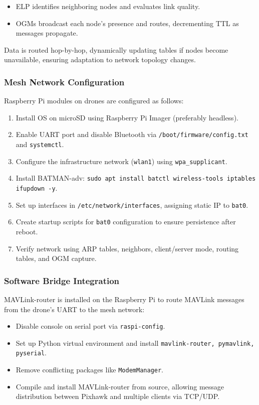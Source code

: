 \begin{itemize}
    \item ELP identifies neighboring nodes and evaluates link quality.
    \item OGMs broadcast each node’s presence and routes, decrementing TTL as messages propagate.
\end{itemize}

Data is routed hop-by-hop, dynamically updating tables if nodes become unavailable, ensuring adaptation to network topology changes.

\subsubsection{Mesh Network Configuration}

Raspberry Pi modules on drones are configured as follows:
\begin{enumerate}
    \item Install OS on microSD using Raspberry Pi Imager (preferably headless).
    \item Enable UART port and disable Bluetooth via \texttt{/boot/firmware/config.txt} and \texttt{systemctl}.
    \item Configure the infrastructure network (\texttt{wlan1}) using \texttt{wpa\_supplicant}.
    \item Install BATMAN-adv: \texttt{sudo apt install batctl wireless-tools iptables ifupdown -y}.
    \item Set up interfaces in \texttt{/etc/network/interfaces}, assigning static IP to \texttt{bat0}.
    \item Create startup scripts for \texttt{bat0} configuration to ensure persistence after reboot.
    \item Verify network using ARP tables, neighbors, client/server mode, routing tables, and OGM capture.
\end{enumerate}

\subsubsection{Software Bridge Integration}

MAVLink-router is installed on the Raspberry Pi to route MAVLink messages from the drone's UART to the mesh network:
\begin{itemize}
    \item Disable console on serial port via \texttt{raspi-config}.
    \item Set up Python virtual environment and install \texttt{mavlink-router, pymavlink, pyserial}.
    \item Remove conflicting packages like \texttt{ModemManager}.
    \item Compile and install MAVLink-router from source, allowing message distribution between Pixhawk and multiple clients via TCP/UDP.
\end{itemize}




